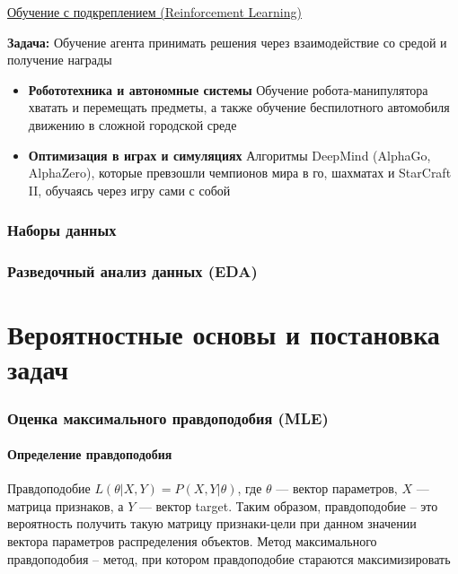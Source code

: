 \documentclass[a4paper, 14pt]{article}
\begin{document}
    \underline{Обучение с подкреплением (Reinforcement Learning)}
    
    \textbf{Задача:} Обучение агента принимать решения через взаимодействие со средой и получение награды
    \begin{itemize}
        
        \item \textbf{Робототехника и автономные системы} Обучение робота-манипулятора хватать и перемещать
        предметы, а также обучение беспилотного автомобиля движению в сложной городской среде
        
        \item \textbf{Оптимизация в играх и симуляциях} Алгоритмы DeepMind (AlphaGo, AlphaZero), которые превзошли
        чемпионов мира в го, шахматах и StarCraft II, обучаясь через игру сами с собой
    
    \end{itemize}
    
    \section{Наборы данных}
    
    
    \section{Разведочный анализ данных (EDA)}
    
    
    \part{Вероятностные основы и постановка задач}
    
    \section{Оценка максимального правдоподобия (MLE)}
    
    \subsection{Определение правдоподобия}
    
    Правдоподобие $L(\theta | X, Y ) = P(X, Y | \theta)$, где $\theta$ — вектор параметров, $X$ — матрица признаков,
    а $Y$ — вектор target.
    Таким образом, правдоподобие -- это вероятность получить такую матрицу признаки-цели при данном значении вектора
    параметров распределения объектов.
    Метод максимального правдоподобия -- метод, при котором правдоподобие стараются максимизировать
    
\end{document}
